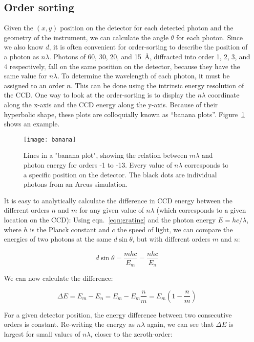 \documentclass[12pt]{spieman}  %
\begin{document}
\begin{spacing}{2}
\section{Order sorting}
\label{sect:ordersorting}
Given the $(x, y)$ position on the detector for each detected photon and the geometry of the instrument, we can calculate the angle $\theta$ for each photon. Since we also know $d$, it is often convenient for order-sorting to describe the position of a photon as $n\lambda$. Photons of 60, 30, 20, and 15~\AA{}, diffracted into order 1, 2, 3, and 4 respectively, fall on the same position on the detector, because they have the same value for $n\lambda$. To determine the wavelength of each photon, it must be assigned to an order $n$. This can be done using the intrinsic energy resolution of the CCD. One way to look at the order-sorting is to display the $n\lambda$ coordinate along the x-axis and the CCD energy along the y-axis. Because of their hyperbolic shape, these plots are colloquially known as ``banana plots''. Figure~\ref{fig:banana} shows an example.

\begin{figure}
    \centering
    \texttt{[image: banana]}
    \caption {\label{fig:banana}
    Lines in a "banana plot", showing the relation between $m\lambda$ and photon energy for orders -1 to -13. Every value of $n\lambda$ corresponds to a specific position on the detector. The black dots are individual photons from an Arcus simulation.
}
\end{figure}

It is easy to analytically calculate the difference in CCD energy between the different orders $n$ and $m$ for any given value of $n\lambda$ (which corresponds to a given location on the CCD): Using eqn.~\ref{eqn:grating} and the photon energy $E = h c / \lambda$, where $h$ is the Planck constant and $c$ the speed of light, we can compare the energies of two photons at the same $d \sin\theta$, but with different orders $m$ and $n$:

$$ d \sin\theta = \frac{m h c}{E_m} = \frac{n h c}{E_n} $$

We can now calculate the difference:

$$\Delta E = E_m - E_n = E_m - E_m \frac{n}{m} =  E_m (1-\frac{n}{m})$$

For a given detector position, the energy difference between two consecutive orders is constant. Re-writing the energy as $n\lambda$ again, we can see that $\Delta E$ is largest for small values of $n\lambda$, closer to the zeroth-order:


\end{spacing}
\end{document}
